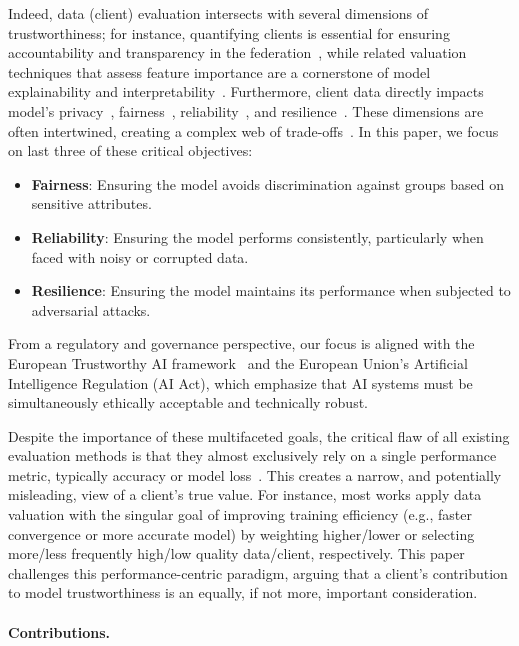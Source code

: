 \documentclass{uai2026}
\begin{document}
Indeed, data (client) evaluation intersects with several dimensions of trustworthiness; for instance, quantifying clients is essential for ensuring accountability and transparency in the federation~\cite{siomos2023contribution}, while related valuation techniques that assess feature importance are a cornerstone of model explainability and interpretability~\cite{gunning2019xai}. Furthermore, client data directly impacts model's privacy~\cite{liu2021machine}, fairness~\cite{mehrabi2021survey}, reliability~\cite{goldblum2022dataset}, and resilience~\cite{ibitoye2019threat}. These dimensions are often intertwined, creating a complex web of trade-offs~\cite{liu2020privacy, shaham2023holistic, li2024triangular}. In this paper, we focus on last three of these critical objectives:

\begin{itemize}
    \item \textbf{Fairness}: Ensuring the model avoids discrimination against groups based on sensitive attributes.
    \item \textbf{Reliability}: Ensuring the model performs consistently, particularly when faced with noisy or corrupted data.
    \item \textbf{Resilience}: Ensuring the model maintains its performance when subjected to adversarial attacks.
\end{itemize}

From a regulatory and governance perspective, our focus is aligned with the European Trustworthy AI framework~\cite{kaur2022trustworthy} and the European Union's Artificial Intelligence Regulation (AI Act), which emphasize that AI systems must be simultaneously ethically acceptable and technically robust.

Despite the importance of these multifaceted goals, the critical flaw of all existing evaluation methods is that they almost exclusively rely on a single performance metric, typically accuracy or model loss~\cite{naidu2023review}. This creates a narrow, and potentially misleading, view of a client's true value. For instance, most works apply data valuation with the singular goal of improving training efficiency (e.g., faster convergence or more accurate model) by weighting higher/lower or selecting more/less frequently high/low quality data/client, respectively. This paper challenges this performance-centric paradigm, arguing that a client's contribution to model trustworthiness is an equally, if not more, important consideration.

\paragraph{Contributions. }
\end{document}
